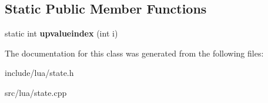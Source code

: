 \subsection*{Static Public Member Functions}
\begin{DoxyCompactItemize}
\item 
\mbox{\label{classlua_1_1State_af845a5ecb15f65f32395c6d6d02a4437}} 
static int {\bfseries upvalueindex} (int i)
\end{DoxyCompactItemize}


The documentation for this class was generated from the following files\+:\begin{DoxyCompactItemize}
\item 
include/lua/state.\+h\item 
src/lua/state.\+cpp\end{DoxyCompactItemize}
